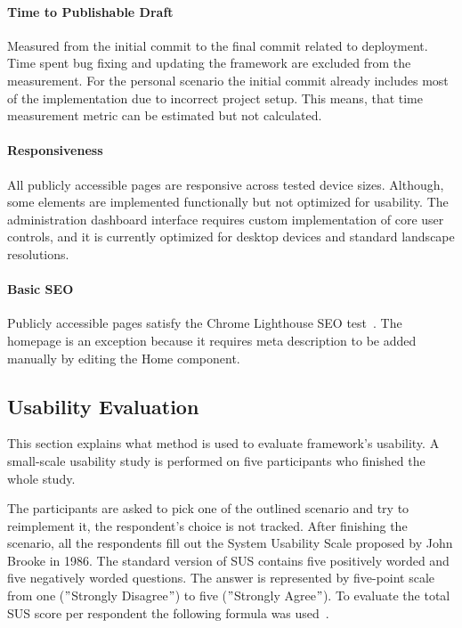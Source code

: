 \paragraph{Time to Publishable Draft}
Measured from the initial commit to the final commit related to deployment.
Time spent bug fixing and updating the framework are excluded from the measurement.
For the personal scenario the initial commit already includes most of the implementation due to incorrect project setup.
This means, that time measurement metric can be estimated but not calculated.

\paragraph{Responsiveness}
All publicly accessible pages are responsive across tested device sizes.
Although, some elements are implemented functionally but not optimized for usability.
The administration dashboard interface requires custom implementation of core user controls, and it is currently optimized
for desktop devices and standard landscape resolutions.

\paragraph{Basic SEO}
Publicly accessible pages satisfy the Chrome Lighthouse SEO test~\parencite{chrom_lighthouse}.
The homepage is an exception because it requires meta description to be added manually by editing the Home component.



\subsection{Usability Evaluation}\label{subsec:usability-evaluation}
This section explains what method is used to evaluate framework's usability.
A small-scale usability study is performed on five participants who finished the whole study.

The participants are asked to pick one of the outlined scenario and try to reimplement it, the respondent's choice is not tracked.
After finishing the scenario, all the respondents fill out the System Usability Scale proposed by John Brooke in 1986.
The standard version of SUS contains five positively worded and five negatively worded questions.
The answer is represented by five-point scale from one (\("\)Strongly Disagree\("\)) to five (\("\)Strongly Agree\("\)).
To evaluate the total SUS score per respondent the following formula was used~\parencite{lewis_sus}.

